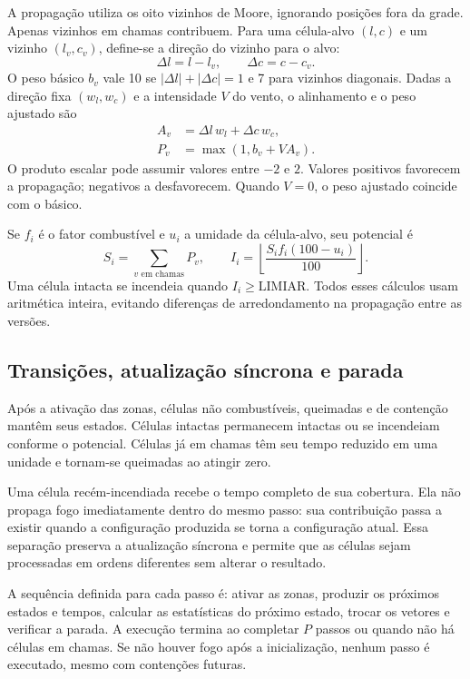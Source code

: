 \documentclass[12pt,a4paper]{article}
\begin{document}
A propagação utiliza os oito vizinhos de Moore, ignorando posições fora
da grade. Apenas vizinhos em chamas contribuem. Para uma célula-alvo $(l,c)$
e um vizinho $(l_v,c_v)$, define-se a direção do vizinho para o alvo:
\begin{equation}
\Delta l=l-l_v,\qquad \Delta c=c-c_v.
\end{equation}
O peso básico $b_v$ vale 10 se $|\Delta l|+|\Delta c|=1$ e 7 para
vizinhos diagonais. Dadas a direção fixa $(w_l,w_c)$ e a intensidade $V$
do vento, o alinhamento e o peso ajustado são
\begin{align}
A_v &= \Delta l\,w_l+\Delta c\,w_c, \\
P_v &= \max(1,b_v+V A_v).
\end{align}
O produto escalar pode assumir valores entre $-2$ e $2$. Valores positivos
favorecem a propagação; negativos a desfavorecem. Quando $V=0$, o peso
ajustado coincide com o básico.

Se $f_i$ é o fator combustível e $u_i$ a umidade da célula-alvo, seu
potencial é
\begin{equation}
S_i=\sum_{v\text{ em chamas}}P_v,
\qquad I_i=\left\lfloor\frac{S_i f_i(100-u_i)}{100}\right\rfloor.
\end{equation}
Uma célula intacta se incendeia quando $I_i\geq\mathrm{LIMIAR}$.
Todos esses cálculos usam aritmética inteira, evitando diferenças de
arredondamento na propagação entre as versões.

\subsection{Transições, atualização síncrona e parada}\label{sec:transicoes}

Após a ativação das zonas, células não combustíveis, queimadas e de
contenção mantêm seus estados. Células intactas permanecem intactas ou
se incendeiam conforme o potencial. Células já em chamas têm seu tempo
reduzido em uma unidade e tornam-se queimadas ao atingir zero.

Uma célula recém-incendiada recebe o tempo completo de sua cobertura.
Ela não propaga fogo imediatamente dentro do mesmo passo: sua contribuição
passa a existir quando a configuração produzida se torna a configuração
atual. Essa separação preserva a atualização síncrona e permite que as
células sejam processadas em ordens diferentes sem alterar o resultado.

A sequência definida para cada passo é: ativar as zonas, produzir os
próximos estados e tempos, calcular as estatísticas do próximo estado,
trocar os vetores e verificar a parada. A execução termina ao completar
$P$ passos ou quando não há células em chamas. Se não houver fogo após a
inicialização, nenhum passo é executado, mesmo com contenções futuras.
\end{document}
